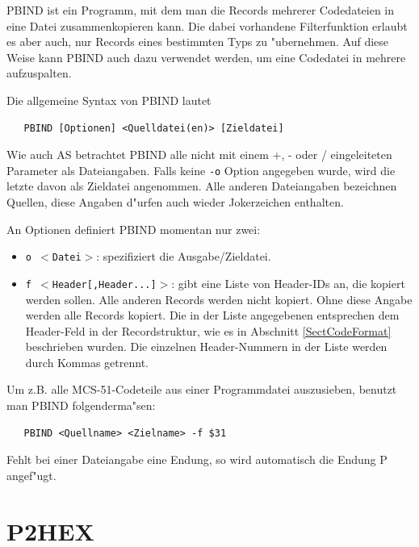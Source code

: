 \documentclass[12pt,a4paper,twoside]{report}
\newcommand{\tty}[1]{{\tt #1}}
\newcommand{\asname}{AS}
\begin{document}
PBIND ist ein Programm, mit dem man die Records mehrerer Codedateien
in eine Datei zusammenkopieren kann.  Die dabei vorhandene Filterfunktion
erlaubt es aber auch, nur Records eines bestimmten Typs zu "ubernehmen.
Auf diese Weise kann PBIND auch dazu verwendet werden, um eine Codedatei
in mehrere aufzuspalten.
\par
Die allgemeine Syntax von PBIND lautet
\begin{verbatim}
   PBIND [Optionen] <Quelldatei(en)> [Zieldatei]
\end{verbatim}
Wie auch \asname{} betrachtet PBIND alle nicht mit einem +, - oder / eingeleiteten
Parameter als Dateiangaben.  Falls keine \tty{-o} Option angegeben wurde, wird
die letzte davon als Zieldatei angenommen.
Alle anderen Dateiangaben bezeichnen Quellen, diese Angaben d"urfen
auch wieder Jokerzeichen enthalten.
\par
An Optionen definiert PBIND momentan nur zwei:
\begin{itemize}
\item{\tty{o $<$Datei$>$}: spezifiziert die Ausgabe/Zieldatei.}
\item{\tty{f $<$Header[,Header...]$>$}: gibt eine Liste von Header-IDs
      an, die kopiert werden sollen.  Alle anderen Records werden
      nicht kopiert.  Ohne diese Angabe werden alle Records kopiert.
      Die in der Liste angegebenen entsprechen dem Header-Feld in der
      Recordstruktur, wie es in Abschnitt \ref{SectCodeFormat} beschrieben wurden. Die
      einzelnen Header-Nummern in der Liste werden durch Kommas getrennt.}
\end{itemize}
Um z.B. alle MCS-51-Codeteile aus einer Programmdatei auszusieben,
benutzt man PBIND folgenderma"sen:
\begin{verbatim}
   PBIND <Quellname> <Zielname> -f $31
\end{verbatim}
Fehlt bei einer Dateiangabe eine Endung, so wird automatisch die Endung
P angef"ugt.


\section{P2HEX}
\end{document}

